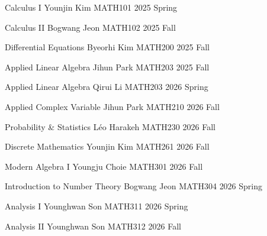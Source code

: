
\roscourse
  {Calculus I}
  {Younjin Kim}
  {}
  {MATH101}
  {2025 Spring}

\roscourse
  {Calculus II}
  {Bogwang Jeon}
  {}
  {MATH102}
  {2025 Fall}

\roscourse
  {Differential Equations}
  {Byeorhi Kim}
  {}
  {MATH200}
  {2025 Fall}

\roscourse
  {Applied Linear Algebra}
  {Jihun Park}
  {}
  {MATH203}
  {2025 Fall}

\roscourse
  {Applied Linear Algebra}
  {Qirui Li}
  {}
  {MATH203}
  {2026 Spring}

\roscourse
  {Applied Complex Variable}
  {Jihun Park}
  {}
  {MATH210}
  {2026 Fall}

\roscourse
  {Probability \& Statistics}
  {Léo Harakeh}
  {}
  {MATH230}
  {2026 Fall}

\roscourse
  {Discrete Mathematics}
  {Younjin Kim}
  {}
  {MATH261}
  {2026 Fall}

\roscourse
  {Modern Algebra I}
  {Youngju Choie}
  {}
  {MATH301}
  {2026 Fall}

\roscourse
  {Introduction to Number Theory}
  {Bogwang Jeon}
  {}
  {MATH304}
  {2026 Spring}

\roscourse
  {Analysis I}
  {Younghwan Son}
  {}
  {MATH311}
  {2026 Spring}

\roscourse
  {Analysis II}
  {Younghwan Son}
  {}
  {MATH312}
  {2026 Fall}
